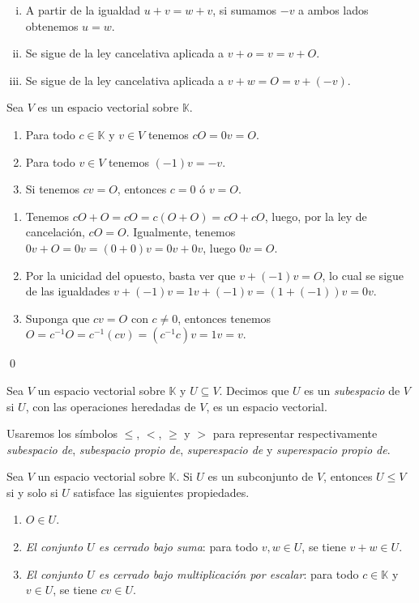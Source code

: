 \dem
\begin{enumerate}[(i)]
  \item A partir de la igualdad $u+v=w+v$, si sumamos $-v$ a ambos lados obtenemos $u=w$.
  \item Se sigue de la ley cancelativa aplicada a $v+o=v=v+O$.
  \item Se sigue de la ley cancelativa aplicada a $v+w=O=v+(-v)$.
\end{enumerate}

\begin{pro}
Sea $V$ es un espacio vectorial sobre $\mathbb{K}$.
\begin{enumerate}
\item Para todo $c\in \mathbb{K}$ y $v\in V$ tenemos $cO=0v=O$.
\item Para todo $v\in V$ tenemos $(-1)v=-v$.
\item Si tenemos $cv=O$, entonces $c=0$ \'o $v=O$.
\end{enumerate}
\end{pro}

\dem
\begin{enumerate}
\item Tenemos $cO+O=cO=c(O+O)=cO+cO$, luego, por la ley de cancelaci\'on, $cO=O$. Igualmente, tenemos $0v+O=0v=(0+0)v=0v+0v$, luego $0v=O$.
\item Por la unicidad del opuesto, basta ver que $v+(-1)v=O$, lo cual se sigue de las igualdades $v+(-1)v=1v+(-1)v=\left(1+(-1)\right)v=0v$.
\item Suponga que $cv=O$ con $c\ne 0$, entonces tenemos $O=c^{-1}O=c^{-1}(cv)=(c^{-1}c)v=1v=v$.
\end{enumerate}
\qed

\begin{defn}
Sea $V$ un espacio vectorial sobre $\mathbb{K}$ y $U\subseteq V$. Decimos que $U$ es un \emph{subespacio} de $V$ si $U$, con las operaciones heredadas de $V$, es un espacio vectorial.
\end{defn}

\begin{nota}
Usaremos los s\'imbolos $\le$, $<$, $\ge$ y $>$ para representar respectivamente \emph{subespacio de}, \emph{subespacio propio de}, \emph{superespacio de} y \emph{superespacio propio de}.
\end{nota}

\begin{pro}\label{subespsiysolosi}
Sea $V$ un espacio vectorial sobre $\mathbb{K}$. Si $U$ es un subconjunto de $V$, entonces $U\le V$ si y solo si $U$ satisface las siguientes propiedades.
\begin{enumerate}
\item $O\in U$.
\item \emph{El conjunto $U$ es cerrado bajo suma}: para todo $v,w\in U$, se tiene $v+w\in U$.
\item \emph{El conjunto $U$ es cerrado bajo multiplicaci\'on por escalar}: para todo $c\in \mathbb{K}$ y $v\in U$, se tiene $cv\in U$.
\end{enumerate} 
\end{pro}

